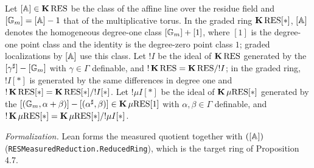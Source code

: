 \setcounter{theorem}{2}
\begin{definition}
\label{res-note}
\leanok
{}
Let $[\mathbb{A}] \in \operatorname{\mathbf{K}} \mathrm{RES}$ be the class of the affine line over the residue field and $[\mathbb{G}_m] = [\mathbb{A}] - 1$ that of the multiplicative torus. In the graded ring $\operatorname{\mathbf{K}} \mathrm{RES}[*]$, $[\mathbb{A}]$ denotes the homogeneous degree-one class $[\mathbb{G}_m] + [1]$, where $[1]$ is the degree-one point class and the identity is the degree-zero point class $1$; graded localizations by $[\mathbb{A}]$ use this class. Let $!I$ be the ideal of $\operatorname{\mathbf{K}} \mathrm{RES}$ generated by the $[\gamma^\sharp] - [\mathbb{G}_m]$ with $\gamma \in \Gamma$ definable, and $!\operatorname{\mathbf{K}} \mathrm{RES} = \operatorname{\mathbf{K}} \mathrm{RES} / !I$; in the graded ring, $!I[*]$ is generated by the same differences in degree one and $!\operatorname{\mathbf{K}} \mathrm{RES}[*] = \operatorname{\mathbf{K}} \mathrm{RES}[*] / !I[*]$. Let $!\mu I[*]$ be the ideal of $\operatorname{\mathbf{K}} \mu\mathrm{RES}[*]$ generated by the $[(\mathbb{G}_m, \alpha + \beta)] - [(\alpha^\sharp, \beta)] \in \operatorname{\mathbf{K}} \mu\mathrm{RES}[1]$ with $\alpha, \beta \in \Gamma$ definable, and $!\operatorname{\mathbf{K}} \mu\mathrm{RES}[*] = \operatorname{\mathbf{K}} \mu\mathrm{RES}[*] / !\mu I[*]$.

\emph{Formalization.} Lean forms the measured quotient together with $([\mathbb{A}])$ (\texttt{RESMeasuredReduction.ReducedRing}), which is the target ring of Proposition 4.7.
\end{definition}

